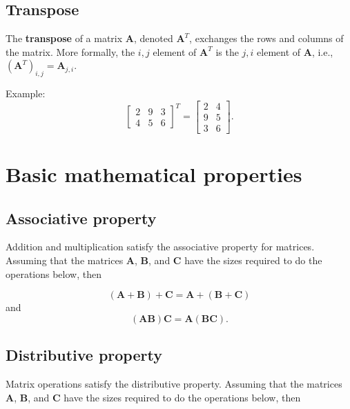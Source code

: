 \documentclass[
]{book}
\theoremstyle{definition}
\theoremstyle{definition}
\theoremstyle{definition}
\theoremstyle{definition}
\theoremstyle{remark}
\begin{document}
\hypertarget{transpose}{%
\subsection{Transpose}\label{transpose}}

The \textbf{transpose} of a matrix \(\mathbf{A}\), denoted \(\mathbf{A}^T\), exchanges the rows and columns of the matrix. More formally, the \(i,j\) element of \(\mathbf{A}^T\) is the \(j,i\) element of \(\mathbf{A}\), i.e., \((\mathbf{A}^T)_{i,j} = \mathbf{A}_{j,i}\).

Example:
\[
\begin{bmatrix}
2 & 9 & 3 \\
4 & 5 & 6
\end{bmatrix}^T = 
\begin{bmatrix}
2 & 4\\
9 & 5\\
3 & 6
\end{bmatrix}.
\]

\hypertarget{basic-mathematical-properties}{%
\section{Basic mathematical properties}\label{basic-mathematical-properties}}

\hypertarget{associative-property}{%
\subsection{Associative property}\label{associative-property}}

Addition and multiplication satisfy the associative property for matrices. Assuming that the matrices \(\mathbf{A}\), \(\mathbf{B}\), and \(\mathbf{C}\) have the sizes required to do the operations below, then

\[(\mathbf{A} + \mathbf{B}) + \mathbf{C} = \mathbf{A} + (\mathbf{B} + \mathbf{C})\]
and
\[(\mathbf{AB})\mathbf{C}=\mathbf{A}(\mathbf{BC}).\]

\hypertarget{distributive-property}{%
\subsection{Distributive property}\label{distributive-property}}

Matrix operations satisfy the distributive property. Assuming that the matrices \(\mathbf{A}\), \(\mathbf{B}\), and \(\mathbf{C}\) have the sizes required to do the operations below, then
\end{document}
